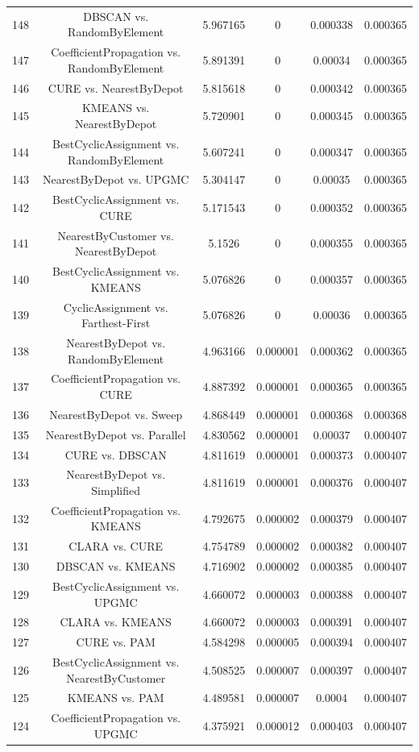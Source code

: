 \documentclass[a4paper,10pt]{article}
\begin{document}
\begin{landscape}
\begin{table}[!htp]
\begin{tabular}{cccccc}
148&DBSCAN vs. RandomByElement&5.967165&0&0.000338&0.000365\\
147&CoefficientPropagation vs. RandomByElement&5.891391&0&0.00034&0.000365\\
146&CURE vs. NearestByDepot&5.815618&0&0.000342&0.000365\\
145&KMEANS vs. NearestByDepot&5.720901&0&0.000345&0.000365\\
144&BestCyclicAssignment vs. RandomByElement&5.607241&0&0.000347&0.000365\\
143&NearestByDepot vs. UPGMC&5.304147&0&0.00035&0.000365\\
142&BestCyclicAssignment vs. CURE&5.171543&0&0.000352&0.000365\\
141&NearestByCustomer vs. NearestByDepot&5.1526&0&0.000355&0.000365\\
140&BestCyclicAssignment vs. KMEANS&5.076826&0&0.000357&0.000365\\
139&CyclicAssignment vs. Farthest-First&5.076826&0&0.00036&0.000365\\
138&NearestByDepot vs. RandomByElement&4.963166&0.000001&0.000362&0.000365\\
137&CoefficientPropagation vs. CURE&4.887392&0.000001&0.000365&0.000365\\
136&NearestByDepot vs. Sweep&4.868449&0.000001&0.000368&0.000368\\
135&NearestByDepot vs. Parallel&4.830562&0.000001&0.00037&0.000407\\
134&CURE vs. DBSCAN&4.811619&0.000001&0.000373&0.000407\\
133&NearestByDepot vs. Simplified&4.811619&0.000001&0.000376&0.000407\\
132&CoefficientPropagation vs. KMEANS&4.792675&0.000002&0.000379&0.000407\\
131&CLARA vs. CURE&4.754789&0.000002&0.000382&0.000407\\
130&DBSCAN vs. KMEANS&4.716902&0.000002&0.000385&0.000407\\
129&BestCyclicAssignment vs. UPGMC&4.660072&0.000003&0.000388&0.000407\\
128&CLARA vs. KMEANS&4.660072&0.000003&0.000391&0.000407\\
127&CURE vs. PAM&4.584298&0.000005&0.000394&0.000407\\
126&BestCyclicAssignment vs. NearestByCustomer&4.508525&0.000007&0.000397&0.000407\\
125&KMEANS vs. PAM&4.489581&0.000007&0.0004&0.000407\\
124&CoefficientPropagation vs. UPGMC&4.375921&0.000012&0.000403&0.000407\\

\end{tabular}
\end{table}
\end{landscape}
\end{document}
